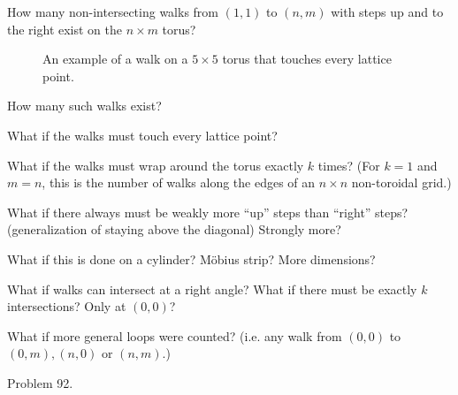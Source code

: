 \documentclass{article}
\begin{document}
  How many non-intersecting walks from $(1,1)$ to $(n, m)$ with steps up and to
  the right exist on the $n \times m$ torus?
\begin{figure}[ht!]
  \centering
  \caption{An example of a walk on a $5 \times 5$ torus that touches every lattice point.}
\end{figure}

\begin{question}
  How many such walks exist?
\end{question}

\begin{related}
  \item What if the walks must touch every lattice point?
  \item What if the walks must wrap around the torus exactly $k$ times?
  (For $k = 1$ and $m = n$, this is the number of walks along the edges of an
  $n \times n$ non-toroidal grid.)
  \item What if there always must be weakly more ``up'' steps than ``right''
    steps? (generalization of staying above the diagonal) Strongly more?
  \item What if this is done on a cylinder? M\"obius strip? More dimensions?
  \item What if walks can intersect at a right angle? What if there must be
  exactly $k$ intersections? Only at $(0,0)$?
  \item What if more general loops were counted?
    (i.e. any walk from $(0,0)$ to $(0,m), (n,0)$ or $(n,m)$.)
\end{related}

\begin{references}
  \item Problem 92.
\end{references}
\end{document}
